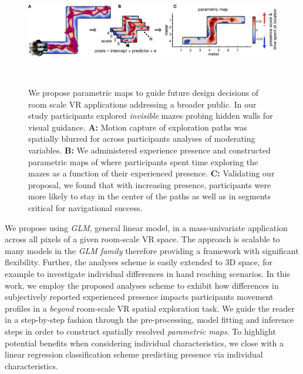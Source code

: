 \begin{figure}[!ht]
\centering
  \includegraphics[width=\linewidth]{figures/fig1.pdf}
  \caption{We propose parametric maps to guide future design decisions of room scale VR applications addressing a broader public. In our study participants explored \textit{invisible} mazes probing hidden walls for visual guidance. \textbf{A:} Motion capture of exploration paths was spatially blurred for across participants analyses of moderating variables. \textbf{B:} We administered experience presence and constructed parametric maps of where participants spent time exploring the mazes as a function of their experienced presence. \textbf{C:} Validating our proposal, we found that with increasing presence, participants were more likely to stay in the center of the paths as well as in segments critical for navigational success.}~\label{fig:methods}
\end{figure}

We propose using \textit{GLM}, general linear model, in a mass-univariate application across all pixels of a given room-scale VR space. The approach is scalable to many models in the \textit{GLM family} therefore providing a framework with significant flexibility. Further, the analyses scheme is easily extended to 3D space, for example to investigate individual differences in hand reaching scenarios. In this work, we employ the proposed analyses scheme to exhibit how differences in subjectively reported experienced presence impacts participants movement profiles in a \textit{beyond} room-scale VR spatial exploration task. We guide the reader in a step-by-step fashion through the pre-processing, model fitting and inference steps in order to construct spatially resolved \textit{parametric maps}. To highlight potential benefits when considering individual characteristics, we close with a linear regression classification scheme predicting presence via individual characteristics.

